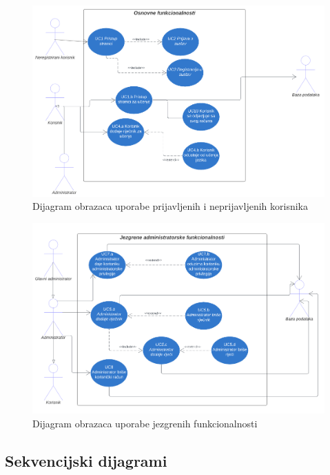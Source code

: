 				\begin{figure}[H]
					\includegraphics[scale=0.5]{dijagrami/Prijava.png} 
					\centering
					\caption{Dijagram obrazaca uporabe prijavljenih i neprijavljenih korisnika}
					\label{fig:class_diagram}
				\end{figure}
				\eject
				\begin{figure}[H]
					\includegraphics[scale=0.5]{dijagrami/Jezgrene.png} 
					\centering
					\caption{Dijagram obrazaca uporabe jezgrenih funkcionalnosti} 
					\label{fig:class_diagram}
				\end{figure}
				\eject
				
				


			\subsection{Sekvencijski dijagrami}

